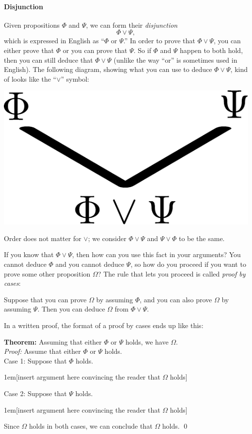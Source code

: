 \documentclass[12pt]{article}
\newcommand{\OR}{\vee}
\newcounter{rule}
\def\putRuleNumber{\refstepcounter{rule}\therule}
\newcommand{\indented}[1]{\begin{adjustwidth}{1em}{}#1\end{adjustwidth}}
\newcommand{\THM}[2]{\textbf{Theorem:} #1\\[0.5em]\textit{Proof:} #2\qed}
\newcommand{\RULE}[2]{\begin{tcolorbox}[title=Rule \putRuleNumber: #1,colbacktitle=white,coltitle=black,colback=white]#2\end{tcolorbox}}
\def\pA{\Phi}
\def\pB{\Psi}
\def\pC{\Omega}
\begin{document}
\paragraph{Disjunction}
Given propositions $\pA$ and $\pB$, we can form their \emph{disjunction}
$$
\pA \OR \pB,
$$
which is expressed in English as ``$\pA$ or $\pB$.''
In order to prove that $\pA\OR\pB$, you can either prove that $\pA$ or you can prove that $\pB$.
So if $\pA$ and $\pB$ happen to both hold, then you can still deduce that $\pA\OR\pB$
(unlike the way ``or'' is sometimes used in English).
The following diagram, showing what you can use to deduce $\pA\OR\pB$, kind of looks like the ``$\OR$'' symbol:
\begin{center}\includegraphics[scale=0.5]{orDiagram.pdf}\end{center}
Order does not matter for $\OR$; we consider $\pA\OR\pB$ and $\pB\OR\pA$ to be the same.

If you know that $\pA\OR\pB$, then how can you use this fact in your arguments?
You cannot deduce $\pA$ and you cannot deduce $\pB$, so how do you proceed if you want to prove some other proposition $\pC$?
The rule that lets you proceed is called \emph{proof by cases}:
\RULE{Proof by cases}{
Suppose that you can prove $\pC$ by assuming $\pA$, and you can also prove $\pC$ by assuming $\pB$.
Then you can deduce $\pC$ from $\pA\OR\pB$.
}
In a written proof, the format of a proof by cases ends up like this:

\THM{Assuming that either $\pA$ or $\pB$ holds, we have $\pC$.}{
Assume that either $\pA$ or $\pB$ holds.\\
Case 1: Suppose that $\pA$ holds.
\indented{[insert argument here convincing the reader that $\pC$ holds]}
Case 2: Suppose that $\pB$ holds.
\indented{[insert argument here convincing the reader that $\pC$ holds]}
Since $\pC$ holds in both cases, we can conclude that $\pC$ holds.
}
\end{document}
